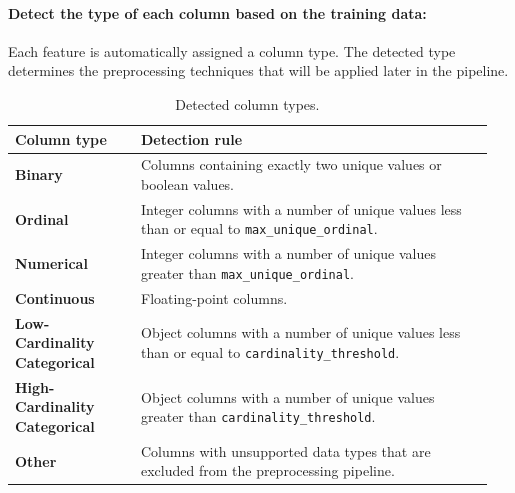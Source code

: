 \paragraph{Detect the type of each column based on the training data:}\par
Each feature is automatically assigned a column type. The detected type determines the preprocessing techniques that will be applied later in the pipeline.
\begin{table}[!htbp]
\centering
\small
\renewcommand{\arraystretch}{1.15}
\setlength{\tabcolsep}{4pt}
\caption{Detected column types.}
\begin{tabular}{p{0.25\linewidth}p{0.70\linewidth}}
\toprule
\textbf{Column type} & \textbf{Detection rule}\\
\midrule
\textbf{Binary} & Columns containing exactly two unique values or boolean values.\\
\textbf{Ordinal} & Integer columns with a number of unique values less than or equal to \texttt{max\_unique\_ordinal}.\\
\textbf{Numerical} & Integer columns with a number of unique values greater than \texttt{max\_unique\_ordinal}.\\
\textbf{Continuous} & Floating-point columns.\\
\textbf{Low-Cardinality Categorical} & Object columns with a number of unique values less than or equal to \texttt{cardinality\_threshold}.\\
\textbf{High-Cardinality Categorical} & Object columns with a number of unique values greater than \texttt{cardinality\_threshold}.\\
\textbf{Other} & Columns with unsupported data types that are excluded from the preprocessing pipeline.\\
\bottomrule
\end{tabular}
\end{table}
